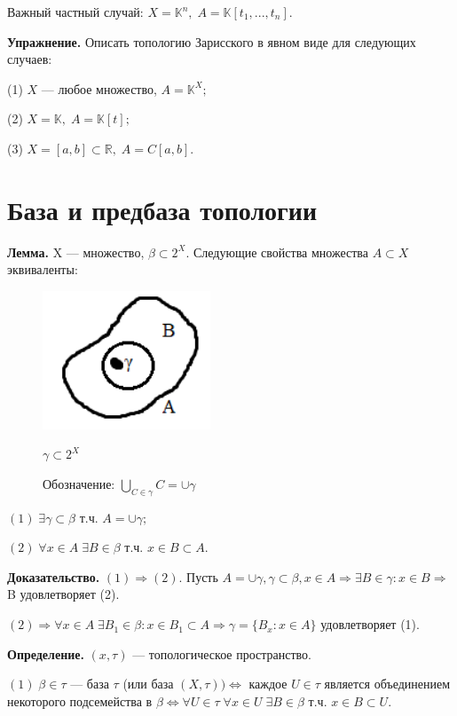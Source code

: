 \documentclass[12pt,a4paper]{article}
\begin{document}
Важный частный случай: $X = \mathbb{K}^n, \; A = \mathbb{K}[t_1, ..., t_n].$

\textbf{Упражнение.} Описать топологию Зарисского в явном виде для следующих случаев:

(1) $X$ --- любое множество, $A = \mathbb{K}^X;$

(2) $X = \mathbb{K}, \; A = \mathbb{K}[t];$

(3) $X = [a, b] \subset \mathbb{R}, \; A = C[a,b].$

\section{База и предбаза топологии}

\textbf{Лемма.} X --- множество, $\beta \subset 2^{X}.$ Следующие свойства множества $A \subset X$ эквиваленты: 

\begin{figure}
	
	\includegraphics[width = 5cm]{lect3_1.png}
	
	$\gamma \subset 2^X$
	
	Обозначение: $\bigcup_{C \in \gamma} C = \cup \gamma$
\end{figure}

$(1) \; \exists \gamma \subset \beta$ т.ч. $A = \cup \gamma;$

$(2) \; \forall x \in A \; \exists B \in \beta$ т.ч. $x \in B \subset A.$ 

\textbf{Доказательство.} $(1) \Rightarrow (2).$ Пусть $A = \cup \gamma, \gamma \subset \beta, x \in A \Rightarrow \exists B \in \gamma: x \in B \Rightarrow$ B удовлетворяет (2). 

$(2) \Rightarrow \forall x \in A \; \exists B_{1} \in \beta: x \in B_{1} \subset A \Rightarrow \gamma = \{B_{x}: x \in A\}$ удовлетворяет (1). 

\textbf{Определение.} $(x, \tau)$ --- топологическое пространство. 

$(1) \; \beta \in \tau$ --- база $\tau$ (или база $(X, \tau)) \Leftrightarrow$ каждое $U \in \tau$ является объединением некоторого подсемейства в $\beta \Leftrightarrow \forall U \in \tau \; \forall x \in U \; \exists B \in \beta$ т.ч. $x \in B \subset U.$ 
\end{document}
